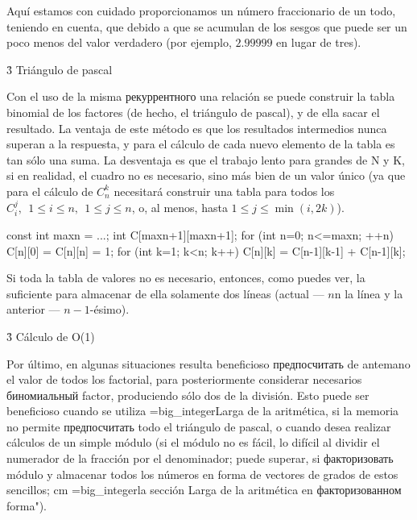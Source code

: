 Aquí estamos con cuidado proporcionamos un número fraccionario de un todo, teniendo en cuenta, que debido a que se acumulan de los sesgos que puede ser un poco menos del valor verdadero (por ejemplo, $2.99999$ en lugar de tres).

\h3{ Triángulo de pascal }

Con el uso de la misma рекуррентного una relación se puede construir la tabla binomial de los factores (de hecho, el triángulo de pascal), y de ella sacar el resultado. La ventaja de este método es que los resultados intermedios nunca superan a la respuesta, y para el cálculo de cada nuevo elemento de la tabla es tan sólo una suma. La desventaja es que el trabajo lento para grandes de N y K, si en realidad, el cuadro no es necesario, sino más bien de un valor único (ya que para el cálculo de $C_n^k$ necesitará construir una tabla para todos los $C_i^j,\ \ 1 \le i \le n,\ \ 1 \le j \le n$, o, al menos, hasta $1 \le j \le \min(i,2k)$).

\code

const int maxn = ...;
int C[maxn+1][maxn+1];
for (int n=0; n<=maxn; ++n) {
C[n][0] = C[n][n] = 1;
for (int k=1; k<n; k++)
C[n][k] = C[n-1][k-1] + C[n-1][k];
}
\endcode

Si toda la tabla de valores no es necesario, entonces, como puedes ver, la suficiente para almacenar de ella solamente dos líneas (actual --- $n$n la línea y la anterior --- $n-1$-ésimo).

\h3{ Cálculo de O(1) }

Por último, en algunas situaciones resulta beneficioso предпосчитать de antemano el valor de todos los factorial, para posteriormente considerar necesarios биномиальный factor, produciendo sólo dos de la división. Esto puede ser beneficioso cuando se utiliza \algohref=big_integer{Larga de la aritmética}, si la memoria no permite предпосчитать todo el triángulo de pascal, o cuando desea realizar cálculos de un simple módulo (si el módulo no es fácil, lo difícil al dividir el numerador de la fracción por el denominador; puede superar, si факторизовать módulo y almacenar todos los números en forma de vectores de grados de estos sencillos; cm \algohref=big_integer{la sección Larga de la aritmética en факторизованном forma"}).
